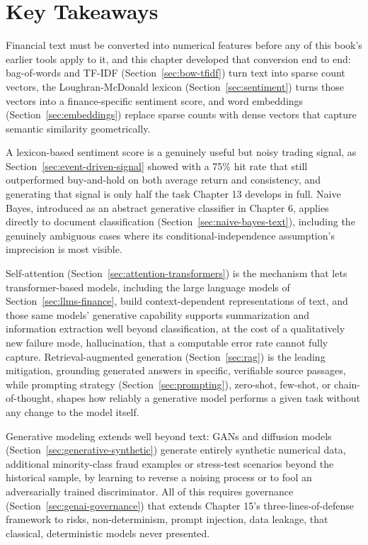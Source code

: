\documentclass[../ai_in_finance]{subfiles}
\begin{document}
\section{Key Takeaways}

Financial text must be converted into numerical features before any of this book's earlier tools apply to it, and this chapter developed that conversion end to end: bag-of-words and TF-IDF (Section~\ref{sec:bow-tfidf}) turn text into sparse count vectors, the Loughran-McDonald lexicon (Section~\ref{sec:sentiment}) turns those vectors into a finance-specific sentiment score, and word embeddings (Section~\ref{sec:embeddings}) replace sparse counts with dense vectors that capture semantic similarity geometrically.

A lexicon-based sentiment score is a genuinely useful but noisy trading signal, as Section~\ref{sec:event-driven-signal} showed with a 75\% hit rate that still outperformed buy-and-hold on both average return and consistency, and generating that signal is only half the task Chapter 13 develops in full. Naive Bayes, introduced as an abstract generative classifier in Chapter 6, applies directly to document classification (Section~\ref{sec:naive-bayes-text}), including the genuinely ambiguous cases where its conditional-independence assumption's imprecision is most visible.

Self-attention (Section~\ref{sec:attention-transformers}) is the mechanism that lets transformer-based models, including the large language models of Section~\ref{sec:llms-finance}, build context-dependent representations of text, and those same models' generative capability supports summarization and information extraction well beyond classification, at the cost of a qualitatively new failure mode, hallucination, that a computable error rate cannot fully capture. Retrieval-augmented generation (Section~\ref{sec:rag}) is the leading mitigation, grounding generated answers in specific, verifiable source passages, while prompting strategy (Section~\ref{sec:prompting}), zero-shot, few-shot, or chain-of-thought, shapes how
reliably a generative model performs a given task without any change to the model itself.

Generative modeling extends well beyond text: GANs and
diffusion models (Section~\ref{sec:generative-synthetic}) generate entirely synthetic numerical data, additional minority-class fraud examples or
stress-test scenarios beyond the historical sample, by learning to reverse a noising process or to fool an adversarially trained discriminator.
All of this requires governance (Section~\ref{sec:genai-governance}) that extends Chapter 15's three-lines-of-defense framework to risks,
non-determinism, prompt injection, data leakage, that classical, deterministic models never presented.
\end{document}
